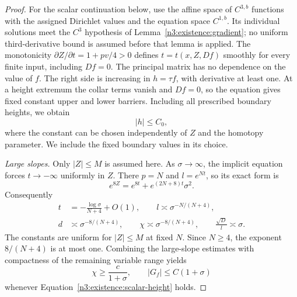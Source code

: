 \begin{proof}
For the scalar continuation below, use the affine space of
$C^{3,b}$ functions with the assigned Dirichlet values and the equation
space $C^{1,b}$. Its individual solutions meet the $C^3$ hypothesis of
Lemma~\ref{n3:existence:gradient}; no uniform third-derivative bound is
assumed before that lemma is applied.
The monotonicity $\partial Z/\partial t=1+pv/4>0$ defines
$t=t(x,Z,Df)$ smoothly for every finite input, including $Df=0$.
The principal matrix has no dependence on the value of $f$.
The right side is increasing in $h=\tau f$, with derivative
at least one. At a height extremum the collar terms vanish and
$Df=0$, so the equation gives fixed constant upper and lower
barriers. Including all prescribed boundary heights, we obtain
\begin{equation}\label{n3:existence:scalar-height}
 |h|\le C_0,
\end{equation}
where the constant can be chosen independently of $Z$ and the
homotopy parameter.  We include the fixed boundary values in its
choice.

\emph{Large slopes.}
Only $|Z|\le M$ is assumed here. As $\sigma\to\infty$,
the implicit equation forces
$t\to-\infty$ uniformly in $Z$.  There $p=N$ and $l=e^{Nt}$,
so its exact form is
\begin{equation}\label{n3:existence:implicit-large-slope}
 e^{8Z}=e^{8t}+e^{(2N+8)t}\sigma^2.
\end{equation}
Consequently
\begin{equation}\label{n3:existence:large-slope-asymptotics}
 \begin{split}
 t&=-\frac{\log\sigma}{N+4}+O(1),\qquad
 l\asymp\sigma^{-N/(N+4)},\\
 d&\asymp\sigma^{-8/(N+4)},\qquad
 \chi\asymp\sigma^{-8/(N+4)},\qquad
 \frac{\sqrt D}{l}\asymp\sigma.
 \end{split}
\end{equation}
The constants are uniform for $|Z|\le M$ at fixed $N$.
Since $N\ge4$, the exponent $8/(N+4)$ is at most one.  Combining
the large-slope estimates with compactness of the remaining variable
range yields
\begin{equation}\label{n3:existence:scalar-growth}
 \chi\ge\frac{c}{1+\sigma},\qquad
 |G_f|\le C(1+\sigma)
\end{equation}
whenever Equation~\eqref{n3:existence:scalar-height} holds.


\end{proof}
